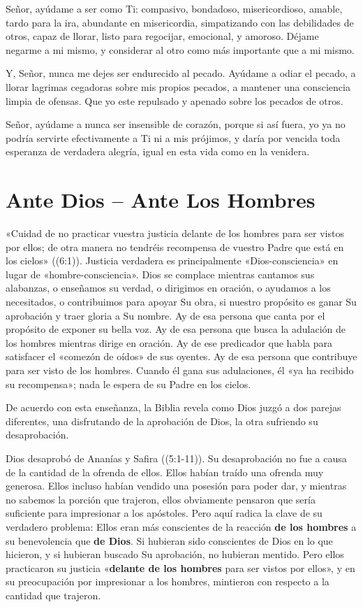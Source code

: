 \documentclass[12pt, twoside, openright]{book}
\begin{document}
Señor, ayúdame a ser como Ti: compasivo, bondadoso, misericordioso, amable, tardo para la ira, abundante en misericordia, simpatizando con las debilidades de otros, capaz de llorar, listo para regocijar, emocional, y amoroso. Déjame negarme a mi mismo, y considerar al otro como más importante que a mi mismo. 

Y, Señor, nunca me dejes ser endurecido al pecado. Ayúdame a odiar el pecado, a llorar lagrimas cegadoras sobre mis propios pecados, a mantener una consciencia limpia de ofensas. Que yo este repulsado y apenado sobre los pecados de otros. 

Señor, ayúdame a nunca ser insensible de corazón, porque si así fuera, yo ya no podría servirte efectivamente a Ti ni a mis prójimos, y daría por vencida toda esperanza de verdadera alegría, igual en esta vida como en la venidera. 

\section{Ante Dios – Ante Los Hombres}
«Cuidad de no practicar vuestra justicia delante de los hombres para ser vistos por ellos; de otra manera no tendréis recompensa de vuestro Padre que está en los cielos» ((6:1)). Justicia verdadera es principalmente «Dios-consciencia» en lugar de «hombre-consciencia». Dios se complace mientras cantamos sus alabanzas, o enseñamos su verdad, o dirigimos en oración, o ayudamos a los necesitados, o contribuimos para apoyar Su obra, si nuestro propósito es ganar Su aprobación y traer gloria a Su nombre. Ay de esa persona que canta por el propósito de exponer su bella voz. Ay de esa persona que busca la adulación de los hombres mientras dirige en oración. Ay de ese predicador que habla para satisfacer el «comezón de oídos» de sus oyentes. Ay de esa persona que contribuye para ser visto de los hombres. Cuando él gana sus adulaciones, él «ya ha recibido su recompensa»; nada le espera de su Padre en los cielos. 

De acuerdo con esta enseñanza, la Biblia revela como Dios juzgó a dos parejas diferentes, una disfrutando de la aprobación de Dios, la otra sufriendo su desaprobación. 

Dios desaprobó de Ananías y Safira ((5:1-11)). Su desaprobación no fue a causa de la cantidad de la ofrenda de ellos. Ellos habían traído una ofrenda muy generosa. Ellos incluso habían vendido una posesión para poder dar, y mientras no sabemos la porción que trajeron, ellos obviamente pensaron que sería suficiente para impresionar a los apóstoles. Pero aquí radica la clave de su verdadero problema: Ellos eran más conscientes de la reacción \textbf{de los hombres} a su benevolencia que \textbf{de Dios}. Si hubieran sido conscientes de Dios en lo que hicieron, y si hubieran buscado Su aprobación, no hubieran mentido. Pero ellos practicaron su justicia «\textbf{delante de los hombres} para ser vistos por ellos», y en su preocupación por impresionar a los hombres, mintieron con respecto a la cantidad que trajeron.
\end{document}
